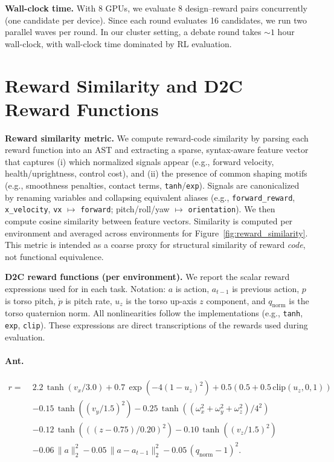 \textbf{Wall-clock time.} With 8 GPUs, we evaluate 8 design--reward pairs concurrently (one candidate per device). Since each round evaluates 16 candidates, we run two parallel waves per round. In our cluster setting, a debate round takes ${\sim}1$ hour wall-clock, with wall-clock time dominated by RL evaluation.

\section{Reward Similarity and D2C Reward Functions}
\label{app:d2c_rewards}
\textbf{Reward similarity metric.} We compute reward-code similarity by parsing each reward function into an AST and extracting a sparse, syntax-aware feature vector that captures (i) which normalized signals appear (e.g., forward velocity, health/uprightness, control cost), and (ii) the presence of common shaping motifs (e.g., smoothness penalties, contact terms, \texttt{tanh}/\texttt{exp}). Signals are canonicalized by renaming variables and collapsing equivalent aliases (e.g., \texttt{forward\_reward}, \texttt{x\_velocity}, \texttt{vx} $\mapsto$ \texttt{forward}; pitch/roll/yaw $\mapsto$ \texttt{orientation}). We then compute cosine similarity between feature vectors. Similarity is computed per environment and averaged across environments for Figure~\ref{fig:reward_similarity}. This metric is intended as a coarse proxy for structural similarity of reward \emph{code}, not functional equivalence.

\textbf{D2C reward functions (per environment).} We report the scalar reward expressions used for \abbrev{} in each task. Notation: $a$ is action, $a_{t-1}$ is previous action, $p$ is torso pitch, $\dot p$ is pitch rate, $u_z$ is the torso up-axis $z$ component, and $q_{\text{norm}}$ is the torso quaternion norm. All nonlinearities follow the implementations (e.g., \texttt{tanh}, \texttt{exp}, \texttt{clip}). These expressions are direct transcriptions of the rewards used during evaluation.

\paragraph{Ant.}
\begin{align*}
r \!=\;& 2.2\,\tanh(v_x/3.0) + 0.7\,\exp(-4(1-u_z)^2) + 0.5(0.5+0.5\,\mathrm{clip}(u_z,0,1)) \\
&-0.15\,\tanh((v_y/1.5)^2) - 0.25\,\tanh((\omega_x^2+\omega_y^2+\omega_z^2)/4^2) \\
&-0.12\,\tanh(((z-0.75)/0.20)^2) - 0.10\,\tanh((v_z/1.5)^2) \\
&-0.06\,\|a\|_2^2 - 0.05\,\|a-a_{t-1}\|_2^2 - 0.05\,(q_{\text{norm}}-1)^2 .
\end{align*}

